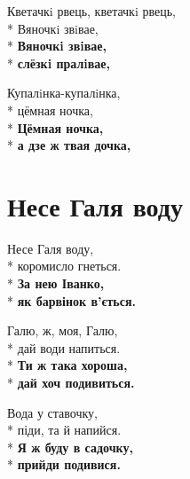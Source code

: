 \medskip

\begin{minipage}{\linewidth}
Кветачкi рвець, кветачкi рвець,\\*
Вяночкi звiвае,\\*
\textbf{Вяночкi звiвае,}\\*
\textbf{слёзкi пралiвае,}\\
\end{minipage}\par\medskip\nobreak

\medskip

\begin{minipage}{\linewidth}
Купалiнка-купалiнка,\\*
цёмная ночка,\\*
\textbf{Цёмная ночка,}\\*
\textbf{а дзе ж твая дочка,}\\
\end{minipage}

\vspace{\fill}\newpage

\section{Несе Галя воду}
\label{song:Несе_Галя_воду}

\medskip

\begin{minipage}{\linewidth}
Несе Галя воду,\\*
коромисло гнеться.\\*
\textbf{За нею Іванко,}\\*
\textbf{як барвінок в’ється.}\\
\end{minipage}\par\medskip\nobreak

\medskip

\begin{minipage}{\linewidth}
Галю, ж, моя, Галю,\\*
дай води напиться.\\*
\textbf{Ти ж така хороша,}\\*
\textbf{дай хоч подивиться.}\\
\end{minipage}\par\medskip\nobreak

\medskip

\begin{minipage}{\linewidth}
Вода у ставочку,\\*
піди, та й напийся.\\*
\textbf{Я ж буду в садочку,}\\*
\textbf{прийди подивися.}\\
\end{minipage}\par\medskip\nobreak

